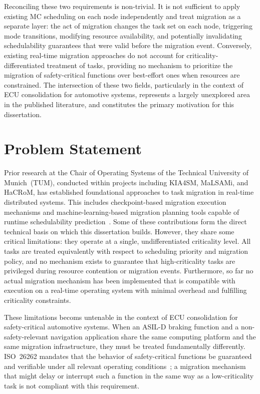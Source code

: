 Reconciling these two requirements is non-trivial. It is not sufficient to apply
existing MC scheduling on each node independently and treat migration as a separate
layer: the act of migration changes the task set on each node, triggering mode
transitions, modifying resource availability, and potentially invalidating
schedulability guarantees that were valid before the migration event. Conversely,
existing real-time migration approaches do not account for criticality-differentiated
treatment of tasks, providing no mechanism to prioritize the migration of safety-critical
functions over best-effort ones when resources are constrained. The intersection of
these two fields, particularly in the context of ECU consolidation for automotive
systems, represents a largely unexplored area in the published literature, and
constitutes the primary motivation for this dissertation.

\section{Problem Statement}
\label{sec:problem}

Prior research at the Chair of Operating Systems of the Technical University of
Munich~(TUM), conducted within projects including KIA4SM, MaLSAMi, and HaCRoM, has
established foundational approaches to task migration in real-time distributed systems.
This includes checkpoint-based migration execution mechanisms and machine-learning-based
migration planning tools capable of runtime schedulability prediction~\cite{taieb1,
	utz1,blieninger1}. Some of these contributions form the direct technical basis on which this
dissertation builds. However, they share some critical limitations: they operate at a
single, undifferentiated criticality level. All tasks are treated equivalently with
respect to scheduling priority and migration policy, and no mechanism exists to
guarantee that high-criticality tasks are privileged during resource contention or
migration events. Furthermore, so far no actual migration mechanism has been implemented that is compatible with execution on a real-time operating system with minimal overhead and fulfilling criticality constraints. 

These limitations becoms untenable in the context of ECU consolidation for
safety-critical automotive systems. When an ASIL-D braking function and a
non-safety-relevant navigation application share the same computing platform and
the same migration infrastructure, they must be treated fundamentally differently.
ISO~26262 mandates that the behavior of safety-critical functions be guaranteed and
verifiable under all relevant operating conditions~\cite{iso26262_2018}; a migration
mechanism that might delay or interrupt such a function in the same way as a
low-criticality task is not compliant with this requirement.

